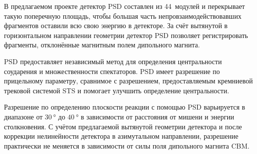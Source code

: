 В предлагаемом проекте детектор PSD составлен из 44~модулей и перекрывает такую поперечную площадь, чтобы большая часть непровзаимодействовавших фрагментов оставили всю свою энергию в детекторе. За счёт вытянутой в горизонтальном направлении геометрии детектор PSD позволяет регистрировать фрагменты, отклонённые магнитным полем дипольного магнита.

PSD предоставляет независимый метод для определения центральности соударения и множественности спектаторов.
PSD имеет разрешение по прицельному параметру, сравнимое с разрешением, предоставляемым кремниевой трековой системой STS и помогает улучшить определение центральности.

Разрешение по определению плоскости реакции с помощью PSD варьируется в диапазоне от $\SI{30}{\degree}$ до $\SI{40}{\degree}$ в зависимости от расстояния от мишени и энергии столкновения. С учётом предлагаемой вытянутой геометрии детектора и после коррекции нелинейности детектора в азимутальном направлении, разрешение практически не меняется в зависимости от силы поля дипольного магнита CBM.




